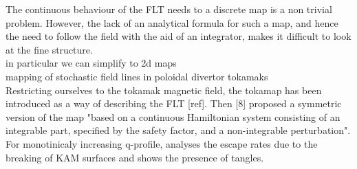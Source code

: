 The continuous behaviour of the FLT needs to a discrete map is a non trivial problem.
However, the lack of an analytical formula for such a map, and hence the need to follow the field with the aid of an integrator, makes it difficult to look at the fine structure.
\\[10pt]
in particular we can simplify to 2d maps
\\
mapping of stochastic field lines in poloidal divertor tokamaks \cite{abdullaev_mappings_2006}
\\[10pt]
Restricting ourselves to the tokamak magnetic field, the tokamap has been introduced as a way of describing the FLT [ref]. Then [8] proposed a symmetric version of the map "based on a continuous Hamiltonian system consisting of an integrable part, specified by the safety factor, and a non-integrable perturbation". For monotinicaly increasing q-profile, \cite{wingen_stochastic_2005} analyses the escape rates due to the breaking of KAM surfaces and shows the presence of tangles. 
\\[10pt]

